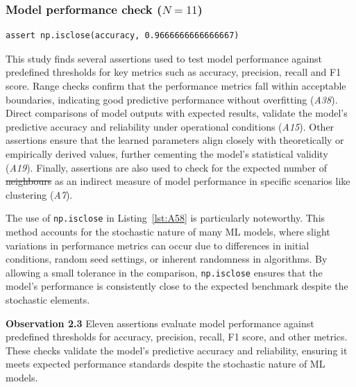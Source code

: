 \documentclass[smallextended]{svjour3}       %
\newcommand{\highlight}[1]{\begin{framed}%
  \noindent#1
\end{framed}}
\providecommand{\DIFadd}[1]{{\protect\color{blue}\uwave{#1}}} %
\providecommand{\DIFdel}[1]{{\protect\color{red}\sout{#1}}} %
\providecommand{\DIFaddbegin}{} %
\providecommand{\DIFaddend}{} %
\providecommand{\DIFdelbegin}{} %
\providecommand{\DIFdelend}{} %
\newcommand{\DIFscaledelfig}{0.5}
\newlength{\DIFdelgraphicswidth} %
\newlength{\DIFdelgraphicsheight} %
\newcommand{\DIFaddincludegraphics}[2][]{{\color{blue}\fbox{\DIFOincludegraphics[#1]{#2}}}} %
\newcommand{\DIFdelincludegraphics}[2][]{%
\sbox{\DIFdelgraphicsbox}{\DIFOincludegraphics[#1]{#2}}%
\settoboxwidth{\DIFdelgraphicswidth}{\DIFdelgraphicsbox} %
\settoboxtotalheight{\DIFdelgraphicsheight}{\DIFdelgraphicsbox} %
\scalebox{\DIFscaledelfig}{%
\parbox[b]{\DIFdelgraphicswidth}{\usebox{\DIFdelgraphicsbox}\\[-\baselineskip] \rule{\DIFdelgraphicswidth}{0em}}\llap{\resizebox{\DIFdelgraphicswidth}{\DIFdelgraphicsheight}{%
\setlength{\unitlength}{\DIFdelgraphicswidth}%
\begin{picture}(1,1)%
\thicklines\linethickness{2pt} %
{\color[rgb]{1,0,0}\put(0,0){\framebox(1,1){}}}%
{\color[rgb]{1,0,0}\put(0,0){\line( 1,1){1}}}%
{\color[rgb]{1,0,0}\put(0,1){\line(1,-1){1}}}%
\end{picture}%
}\hspace*{3pt}}} %
} %
\DeclareRobustCommand{\DIFaddbegin}{\DIFOaddbegin \let\includegraphics\DIFaddincludegraphics} %
\DeclareRobustCommand{\DIFaddend}{\DIFOaddend \let\includegraphics\DIFOincludegraphics} %
\DeclareRobustCommand{\DIFdelbegin}{\DIFOdelbegin \let\includegraphics\DIFdelincludegraphics} %
\DeclareRobustCommand{\DIFdelend}{\DIFOaddend \let\includegraphics\DIFOincludegraphics} %
\begin{document}
\subsubsection{Model performance check ($N = 11$)}\label{sec:assert-model-perf}

\begin{lstlisting}[caption={Assertion \emph{A58} used to check that the accuracy of a model is close to the specified value. The use of \lstinline{np.isclose} allows for small deviations in the accuracy thus accounting for the stochastic nature of ML models.}, label={lst:A58}]
assert np.isclose(accuracy, 0.9666666666666667)
\end{lstlisting}

This study finds several assertions used to test model performance against predefined thresholds for key metrics such as accuracy, precision, recall and F1 score. Range checks confirm that the performance metrics fall within acceptable boundaries, indicating good predictive performance without overfitting (\emph{A38}). Direct comparisons of model outputs with expected results, validate the model's predictive accuracy and reliability under operational conditions (\emph{A15}). Other assertions ensure that the learned parameters align closely with theoretically or empirically derived values, further cementing the model’s statistical validity (\emph{A19}). Finally, assertions are also used to check for the expected number of \DIFdelbegin \DIFdel{neighbours }\DIFdelend \DIFaddbegin \DIFadd{neighbors }\DIFaddend as an indirect measure of model performance in specific scenarios like clustering (\emph{A7}).

The use of \lstinline{np.isclose} in Listing~\ref{lst:A58} is particularly noteworthy. This method accounts for the stochastic nature of many ML models, where slight variations in performance metrics can occur due to differences in initial conditions, random seed settings, or inherent randomness in algorithms. By allowing a small tolerance in the comparison, \lstinline{np.isclose} ensures that the model's performance is consistently close to the expected benchmark despite the stochastic elements.

\DIFdelbegin %
\DIFdelend \DIFaddbegin \highlight{\textbf{Observation 2.3} Eleven assertions evaluate model performance against predefined thresholds for accuracy, precision, recall, F1 score, and other metrics. These checks validate the model's predictive accuracy and reliability, ensuring it meets expected performance standards despite the stochastic nature of ML models.}
\DIFaddend 
\end{document}
